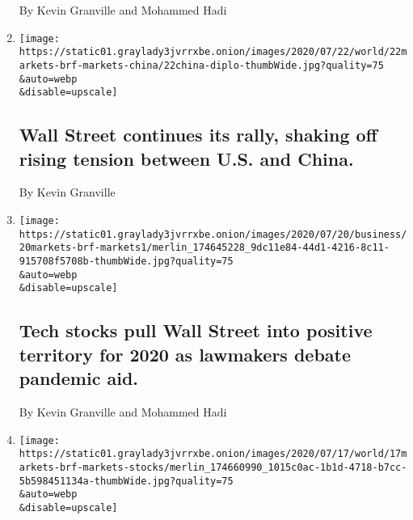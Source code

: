 \begin{enumerate}
  By Kevin Granville and Mohammed Hadi
\item
  \href{/live/2020/07/22/business/stock-market-today-coronavirus/wall-street-continues-its-rally-shaking-off-rising-tension-between-us-and-china}{}

  \texttt{[image: https://static01.graylady3jvrrxbe.onion/images/2020/07/22/world/22markets-brf-markets-china/22china-diplo-thumbWide.jpg?quality=75\\\&auto=webp\\\&disable=upscale]}

  \hypertarget{wall-street-continues-its-rally-shaking-off-rising-tension-between-us-and-china}{%
  \subsection{Wall Street continues its rally, shaking off rising
  tension between U.S. and
  China.}\label{wall-street-continues-its-rally-shaking-off-rising-tension-between-us-and-china}}

  By Kevin Granville
\item
  \href{/live/2020/07/20/business/stock-market-today-coronavirus/tech-stocks-pull-wall-street-into-positive-territory-for-2020-as-lawmakers-debate-pandemic-aid}{}

  \texttt{[image: https://static01.graylady3jvrrxbe.onion/images/2020/07/20/business/20markets-brf-markets1/merlin\_174645228\_9dc11e84-44d1-4216-8c11-915708f5708b-thumbWide.jpg?quality=75\\\&auto=webp\\\&disable=upscale]}

  \hypertarget{tech-stocks-pull-wall-street-into-positive-territory-for-2020-as-lawmakers-debate-pandemic-aid}{%
  \subsection{Tech stocks pull Wall Street into positive territory for
  2020 as lawmakers debate pandemic
  aid.}\label{tech-stocks-pull-wall-street-into-positive-territory-for-2020-as-lawmakers-debate-pandemic-aid}}

  By Kevin Granville and Mohammed Hadi
\item
  \href{/live/2020/07/17/business/stock-market-today-coronavirus/wall-street-notches-its-third-weekly-gain-in-a-row}{}

  \texttt{[image: https://static01.graylady3jvrrxbe.onion/images/2020/07/17/world/17markets-brf-markets-stocks/merlin\_174660990\_1015c0ac-1b1d-4718-b7cc-5b598451134a-thumbWide.jpg?quality=75\\\&auto=webp\\\&disable=upscale]}

  \hypertarget{wall-street-notches-its-third-weekly-gain-in-a-row}{%
}
\end{enumerate}
